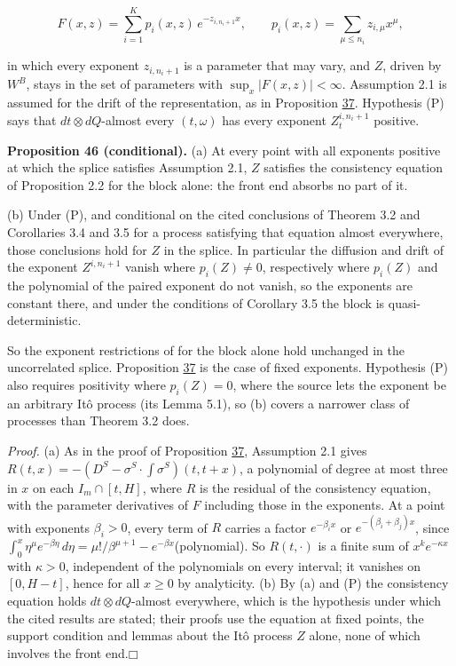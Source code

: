 \documentclass[11pt]{article}
\providecommand{\square}{\mdlgwhtsquare}
\begin{document}
\begin{equation*}
F(x,z)=\sum_{i=1}^Kp_i(x,z)\,e^{-z_{i,n_i+1}x},\qquad p_i(x,z)=\sum_{\mu\le n_i}z_{i,\mu}x^\mu, \tag{3.177}\label{eq:3.177}
\end{equation*}

in which every exponent \(z_{i,n_i+1}\) is a parameter that may vary, and \(Z\), driven by \(W^B\), stays in the set of parameters with \(\sup_x|F(x,z)|<\infty\). Assumption 2.1 is assumed for the drift of the representation, as in Proposition \hyperref[res:Proposition-37]{37}. Hypothesis (P) says that \(dt\otimes dQ\)-almost every \((t,\omega)\) has every exponent \(Z^{i,n_i+1}_t\) positive.

\label{res:Proposition-46}
\textbf{Proposition 46 (conditional).} (a) At every point with all exponents positive at which the splice satisfies Assumption 2.1, \(Z\) satisfies the consistency equation of \cite{filipovic2000exponential} Proposition 2.2 for the block alone: the front end absorbs no part of it.

(b) Under (P), and conditional on the cited conclusions of \cite{filipovic2000exponential} Theorem 3.2 and Corollaries 3.4 and 3.5 for a process satisfying that equation almost everywhere, those conclusions hold for \(Z\) in the splice. In particular the diffusion and drift of the exponent \(Z^{i,n_i+1}\) vanish where \(p_i(Z)\neq0\), respectively where \(p_i(Z)\) and the polynomial of the paired exponent do not vanish, so the exponents are constant there, and under the conditions of Corollary 3.5 the block is quasi-deterministic.

So the exponent restrictions of \cite{filipovic2000exponential} for the block alone hold unchanged in the uncorrelated splice. Proposition \hyperref[res:Proposition-37]{37} is the case of fixed exponents. Hypothesis (P) also requires positivity where \(p_i(Z)=0\), where the source lets the exponent be an arbitrary Itô process (its Lemma 5.1), so (b) covers a narrower class of processes than Theorem 3.2 does.

\emph{Proof.} (a) As in the proof of Proposition \hyperref[res:Proposition-37]{37}, Assumption 2.1 gives \(R(t,x)=-(D^S-\sigma^S\cdot\int\sigma^S)(t,t+x)\), a polynomial of degree at most three in \(x\) on each \(I_m\cap[t,H]\), where \(R\) is the residual of the consistency equation, with the parameter derivatives of \(F\) including those in the exponents. At a point with exponents \(\beta_i>0\), every term of \(R\) carries a factor \(e^{-\beta_ix}\) or \(e^{-(\beta_i+\beta_j)x}\), since \(\int_0^x\eta^\mu e^{-\beta\eta}\,d\eta=\mu!/\beta^{\mu+1}-e^{-\beta x}\)(polynomial). So \(R(t,\cdot)\) is a finite sum of \(x^ke^{-\kappa x}\) with \(\kappa>0\), independent of the polynomials on every interval; it vanishes on \([0,H-t]\), hence for all \(x\ge0\) by analyticity. (b) By (a) and (P) the consistency equation holds \(dt\otimes dQ\)-almost everywhere, which is the hypothesis under which the cited results are stated; their proofs use the equation at fixed points, the support condition and lemmas about the Itô process \(Z\) alone, none of which involves the front end.\hfill$\square$
\end{document}
